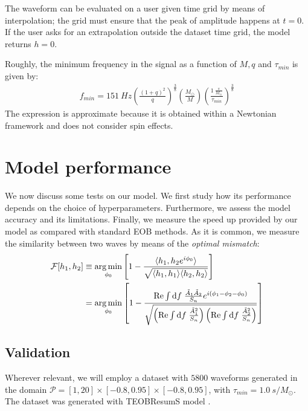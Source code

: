 The waveform can be evaluated on a user given time grid by means of interpolation; the grid must ensure that the peak of amplitude happens at $t=0$.
If the user asks for an extrapolation outside the dataset time grid, the model returns $h = 0$.
\par
Roughly, the minimum frequency in the signal as a function of $M, q$ and $\tau_{min}$ is given by:
\begin{align}\label{eq:f_min}
	f_{min} =
	\SI{151}{Hz}  \left( \frac{(1+q)^2}{q} \right)^{\frac{3}{8}}  \left( \frac{M_\odot}{M} \right)  \left(\frac{\SI{1}{ \frac{s}{M_\odot}}}{\tau_{min}} \right)^{\frac{3}{8}}  
\end{align} 
The expression is approximate because it is obtained within a Newtonian framework and does not consider spin effects.
\par

\section{Model performance}
We now discuss some tests on our model. We first study how its performance depends on the choice of hyperparameters. Furthermore, we assess the model accuracy and its limitations.
Finally, we measure the speed up provided by our model as compared with standard EOB methods.
As it is common, we measure the similarity between two waves by means of the \textit{optimal mismatch}:
\begin{align}
	\mathcal{F}[h_1,h_2] &\equiv \operatorname*{arg\,min}_{\phi_0} \left[ 1- \frac{\langle h_1, h_2 e^{i\phi_0} \rangle}{\sqrt{\langle h_1, h_1 \rangle \langle h_2, h_2 \rangle}} \right]	\label{eq:mismatch_def} \\
	& = \operatorname*{arg\,min}_{\phi_0} \left[ 1- \frac{ \mathrm{Re} \int \operatorname{d}\!{f} \; \frac{\tilde{A}_1 \tilde{A}_2}{S_n} e^{i(\phi_1-\phi_2-\phi_0)}}
		{\sqrt{\left(\mathrm{Re} \int \operatorname{d}\!{f} \; \frac{\tilde{A}_1^2}{S_n}\right)
		\left( \mathrm{Re} \int \operatorname{d}\!{f} \; \frac{\tilde{A}_2^2}{S_n} \right)}} \right] \nonumber
\end{align}
\subsection{Validation}
Wherever relevant, we will employ a dataset with $5800$ waveforms generated in the domain $\mathcal{P} = [1,20]\times[-0.8,0.95]\times[-0.8,0.95]$, with $\tau_{min} = \SI{1.0}{s/M_\odot}$. The dataset was generated with TEOBResumS model \cite{}.
